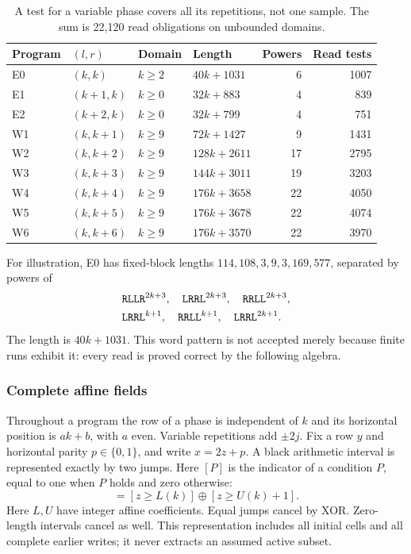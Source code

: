 \begin{table}[t]
\centering\small
\begin{tabular}{llllrr}
\toprule
Program & $(l,r)$ & Domain & Length & Powers & Read tests\\\midrule
E0 & $(k,k)$ & $k\ge2$ & $40k+1031$ & 6 & 1007\\
E1 & $(k+1,k)$ & $k\ge0$ & $32k+883$ & 4 & 839\\
E2 & $(k+2,k)$ & $k\ge0$ & $32k+799$ & 4 & 751\\
W1 & $(k,k+1)$ & $k\ge9$ & $72k+1427$ & 9 & 1431\\
W2 & $(k,k+2)$ & $k\ge9$ & $128k+2611$ & 17 & 2795\\
W3 & $(k,k+3)$ & $k\ge9$ & $144k+3011$ & 19 & 3203\\
W4 & $(k,k+4)$ & $k\ge9$ & $176k+3658$ & 22 & 4050\\
W5 & $(k,k+5)$ & $k\ge9$ & $176k+3678$ & 22 & 4074\\
W6 & $(k,k+6)$ & $k\ge9$ & $176k+3570$ & 22 & 3970\\\bottomrule
\end{tabular}
\caption{A test for a variable phase covers all its repetitions, not one
sample. The sum is 22,120 read obligations on unbounded domains.}\label{basin:tab:schemas}
\end{table}

For illustration, E0 has fixed-block lengths
$114,108,3,9,3,169,577$, separated by powers of
\[
\begin{split}
 &\texttt{RLLR}^{2k+3},\quad\texttt{LRRL}^{2k+3},\quad\texttt{RRLL}^{2k+3},\\
 &\texttt{LRRL}^{k+1},\quad\texttt{RRLL}^{k+1},\quad\texttt{LRRL}^{2k+1}.
\end{split}
\]
The length is $40k+1031$. This word pattern is not accepted merely because
finite runs exhibit it: every read is proved correct by the following algebra.

\subsubsection{Complete affine fields}
Throughout a program the row of a phase is independent of $k$ and its horizontal
position is $ak+b$, with $a$ even. Variable repetitions add $\pm2j$. Fix a row
$y$ and horizontal parity $p\in\{0,1\}$, and write $x=2z+p$. A black arithmetic interval
is represented exactly by two jumps. Here $[P]$ is the indicator of a
condition $P$, equal to one when $P$ holds and zero otherwise:
\begin{equation}
 [L(k)\le z\le U(k)]
   =[z\ge L(k)]\mathbin\oplus[z\ge U(k)+1].               \label{basin:eq:jumps}
\end{equation}
Here $L,U$ have integer affine coefficients. Equal jumps cancel by XOR.
Zero-length intervals cancel as well. This representation includes all
initial cells and all complete earlier writes; it never extracts an assumed
active subset.

